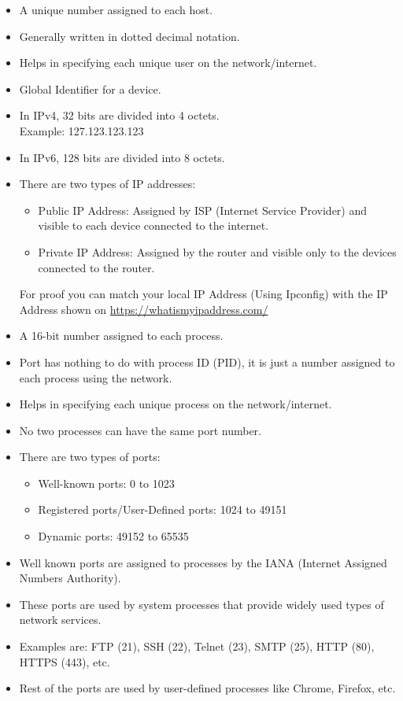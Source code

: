 \documentclass[a4paper, twoside]{report}
\begin{document}
\begin{itemize}
    \item A unique number assigned to each host.
    \item Generally written in dotted decimal notation.
    \item Helps in specifying each unique user on the network/internet.
    \item Global Identifier for a device.
    \item In IPv4, 32 bits are divided into 4 octets. \\
            Example: 127.123.123.123
    \item In IPv6, 128 bits are divided into 8 octets.
    \item There are two types of IP addresses:
        \begin{itemize}
            \item Public IP Address: Assigned by ISP (Internet Service Provider) and visible to each device connected to the internet.
            \item Private IP Address: Assigned by the router and visible only to the devices connected to the router.
        \end{itemize}
        For proof you can match your local IP Address (Using Ipconfig) with the IP Address shown on \url{https://whatismyipaddress.com/}
\end{itemize}

\begin{itemize}
    \item A 16-bit number assigned to each process.
    \item Port has nothing to do with process ID (PID), it is just a number assigned to each process using the network.
    \item Helps in specifying each unique process on the network/internet.
    \item No two processes can have the same port number.
    \item There are two types of ports:
        \begin{itemize}
            \item Well-known ports: 0 to 1023
            \item Registered ports/User-Defined ports: 1024 to 49151
            \item Dynamic ports: 49152 to 65535
        \end{itemize}
    \item Well known ports are assigned to processes by the IANA (Internet Assigned Numbers Authority).
    \item These ports are used by system processes that provide widely used types of network services.
    \item Examples are: FTP (21), SSH (22), Telnet (23), SMTP (25), HTTP (80), HTTPS (443), etc.
    \item Rest of the ports are used by user-defined processes like Chrome, Firefox, etc.
\end{itemize}
\end{document}
